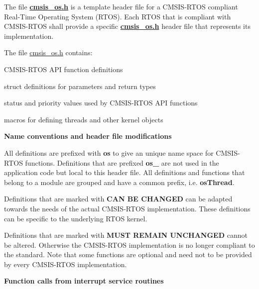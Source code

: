 The file {\bfseries \mbox{\hyperlink{cmsis__os_8h}{cmsis\+\_\+os.\+h}}} is a template header file for a C\+M\+S\+I\+S-\/\+R\+T\+OS compliant Real-\/\+Time Operating System (R\+T\+OS). Each R\+T\+OS that is compliant with C\+M\+S\+I\+S-\/\+R\+T\+OS shall provide a specific {\bfseries \mbox{\hyperlink{cmsis__os_8h}{cmsis\+\_\+os.\+h}}} header file that represents its implementation.

The file \mbox{\hyperlink{cmsis__os_8h}{cmsis\+\_\+os.\+h}} contains\+:
\begin{DoxyItemize}
\item C\+M\+S\+I\+S-\/\+R\+T\+OS A\+PI function definitions
\item struct definitions for parameters and return types
\item status and priority values used by C\+M\+S\+I\+S-\/\+R\+T\+OS A\+PI functions
\item macros for defining threads and other kernel objects
\end{DoxyItemize}

{\bfseries Name conventions and header file modifications}

All definitions are prefixed with {\bfseries os} to give an unique name space for C\+M\+S\+I\+S-\/\+R\+T\+OS functions. Definitions that are prefixed {\bfseries os\+\_\+} are not used in the application code but local to this header file. All definitions and functions that belong to a module are grouped and have a common prefix, i.\+e. {\bfseries os\+Thread}.

Definitions that are marked with {\bfseries C\+AN BE C\+H\+A\+N\+G\+ED} can be adapted towards the needs of the actual C\+M\+S\+I\+S-\/\+R\+T\+OS implementation. These definitions can be specific to the underlying R\+T\+OS kernel.

Definitions that are marked with {\bfseries M\+U\+ST R\+E\+M\+A\+IN U\+N\+C\+H\+A\+N\+G\+ED} cannot be altered. Otherwise the C\+M\+S\+I\+S-\/\+R\+T\+OS implementation is no longer compliant to the standard. Note that some functions are optional and need not to be provided by every C\+M\+S\+I\+S-\/\+R\+T\+OS implementation.

{\bfseries Function calls from interrupt service routines}

